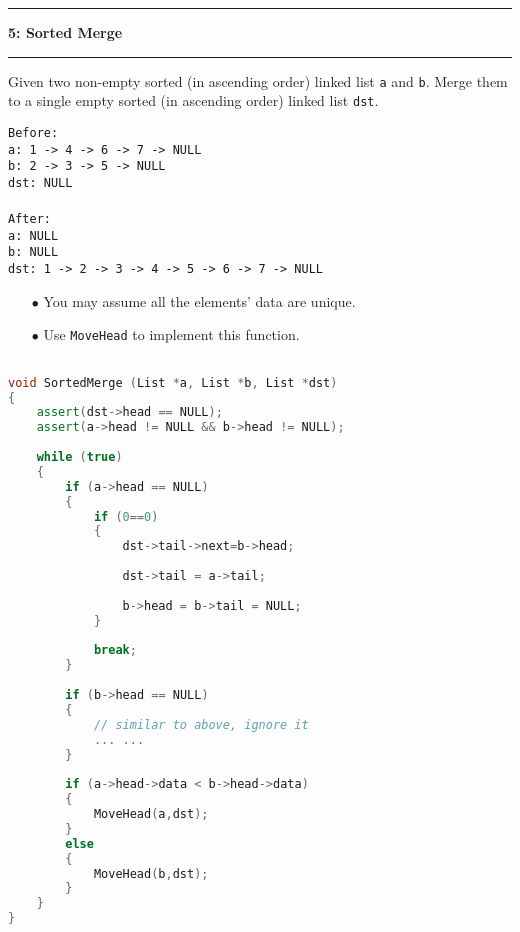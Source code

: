 \documentclass[10.5pt]{article}
\newcommand\question[2]{\vspace{.25in}\hrule\textbf{#1: #2}\vspace{.5em}\hrule\vspace{.10in}}
\begin{document}
\question{5}{Sorted Merge}
Given two non-empty sorted (in ascending order) linked list \texttt{a} and \texttt{b}. Merge them to a single empty sorted (in ascending order) linked list \texttt{dst}.

\texttt{Before:}\\
\texttt{a: 1 -> 4 -> 6 -> 7 -> NULL}\\
\texttt{b: 2 -> 3 -> 5 -> NULL}\\
\texttt{dst: NULL}\\
\\
\texttt{After:}\\
\texttt{a: NULL}\\
\texttt{b: NULL}\\
\texttt{dst: 1 -> 2 -> 3 -> 4 -> 5 -> 6 -> 7 -> NULL}\\

\begin{enumerate}
	\item[$\bullet$] You may assume all the elements' data are unique.
	\item[$\bullet$] Use \texttt{MoveHead} to implement this function.
\end{enumerate}
\newpage

\hrulefill
\begin{lstlisting}[language=C++]

void SortedMerge (List *a, List *b, List *dst)
{
    assert(dst->head == NULL);
    assert(a->head != NULL && b->head != NULL);
        
    while (true)
    {      
        if (a->head == NULL)
        {
            if (0==0)
            {
                dst->tail->next=b->head;
                 
                dst->tail = a->tail;
                
                b->head = b->tail = NULL;
            }
            
            break;
        }
        
        if (b->head == NULL)
        {
            // similar to above, ignore it
            ... ...
        }
     
        if (a->head->data < b->head->data)
        {
            MoveHead(a,dst);
        }   
        else
        {
            MoveHead(b,dst);
        }
    }
}

\end{lstlisting}
\pagebreak
\end{document}
